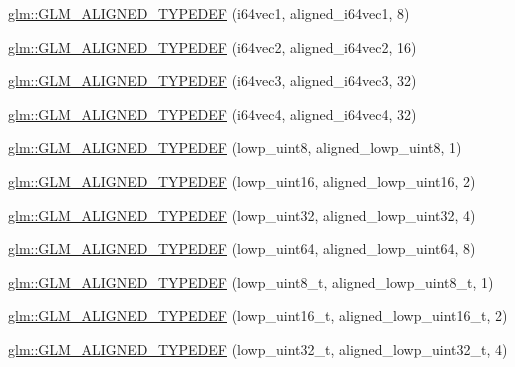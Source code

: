 \begin{DoxyCompactItemize}
\item 
\hyperlink{group__gtx__type__aligned_ga965b1c9aa1800e93d4abc2eb2b5afcbf}{glm\-::\-G\-L\-M\-\_\-\-A\-L\-I\-G\-N\-E\-D\-\_\-\-T\-Y\-P\-E\-D\-E\-F} (i64vec1, aligned\-\_\-i64vec1, 8)
\item 
\hyperlink{group__gtx__type__aligned_ga1f9e9c2ea2768675dff9bae5cde2d829}{glm\-::\-G\-L\-M\-\_\-\-A\-L\-I\-G\-N\-E\-D\-\_\-\-T\-Y\-P\-E\-D\-E\-F} (i64vec2, aligned\-\_\-i64vec2, 16)
\item 
\hyperlink{group__gtx__type__aligned_gad77c317b7d942322cd5be4c8127b3187}{glm\-::\-G\-L\-M\-\_\-\-A\-L\-I\-G\-N\-E\-D\-\_\-\-T\-Y\-P\-E\-D\-E\-F} (i64vec3, aligned\-\_\-i64vec3, 32)
\item 
\hyperlink{group__gtx__type__aligned_ga716f8ea809bdb11b5b542d8b71aeb04f}{glm\-::\-G\-L\-M\-\_\-\-A\-L\-I\-G\-N\-E\-D\-\_\-\-T\-Y\-P\-E\-D\-E\-F} (i64vec4, aligned\-\_\-i64vec4, 32)
\item 
\hyperlink{group__gtx__type__aligned_gad46f8e9082d5878b1bc04f9c1471cdaa}{glm\-::\-G\-L\-M\-\_\-\-A\-L\-I\-G\-N\-E\-D\-\_\-\-T\-Y\-P\-E\-D\-E\-F} (lowp\-\_\-uint8, aligned\-\_\-lowp\-\_\-uint8, 1)
\item 
\hyperlink{group__gtx__type__aligned_ga1246094581af624aca6c7499aaabf801}{glm\-::\-G\-L\-M\-\_\-\-A\-L\-I\-G\-N\-E\-D\-\_\-\-T\-Y\-P\-E\-D\-E\-F} (lowp\-\_\-uint16, aligned\-\_\-lowp\-\_\-uint16, 2)
\item 
\hyperlink{group__gtx__type__aligned_ga7a5009a1d0196bbf21dd7518f61f0249}{glm\-::\-G\-L\-M\-\_\-\-A\-L\-I\-G\-N\-E\-D\-\_\-\-T\-Y\-P\-E\-D\-E\-F} (lowp\-\_\-uint32, aligned\-\_\-lowp\-\_\-uint32, 4)
\item 
\hyperlink{group__gtx__type__aligned_ga45213fd18b3bb1df391671afefe4d1e7}{glm\-::\-G\-L\-M\-\_\-\-A\-L\-I\-G\-N\-E\-D\-\_\-\-T\-Y\-P\-E\-D\-E\-F} (lowp\-\_\-uint64, aligned\-\_\-lowp\-\_\-uint64, 8)
\item 
\hyperlink{group__gtx__type__aligned_ga0ba26b4e3fd9ecbc25358efd68d8a4ca}{glm\-::\-G\-L\-M\-\_\-\-A\-L\-I\-G\-N\-E\-D\-\_\-\-T\-Y\-P\-E\-D\-E\-F} (lowp\-\_\-uint8\-\_\-t, aligned\-\_\-lowp\-\_\-uint8\-\_\-t, 1)
\item 
\hyperlink{group__gtx__type__aligned_gaf2b58f5fb6d4ec8ce7b76221d3af43e1}{glm\-::\-G\-L\-M\-\_\-\-A\-L\-I\-G\-N\-E\-D\-\_\-\-T\-Y\-P\-E\-D\-E\-F} (lowp\-\_\-uint16\-\_\-t, aligned\-\_\-lowp\-\_\-uint16\-\_\-t, 2)
\item 
\hyperlink{group__gtx__type__aligned_gadc246401847dcba155f0699425e49dcd}{glm\-::\-G\-L\-M\-\_\-\-A\-L\-I\-G\-N\-E\-D\-\_\-\-T\-Y\-P\-E\-D\-E\-F} (lowp\-\_\-uint32\-\_\-t, aligned\-\_\-lowp\-\_\-uint32\-\_\-t, 4)

\end{DoxyCompactItemize}
